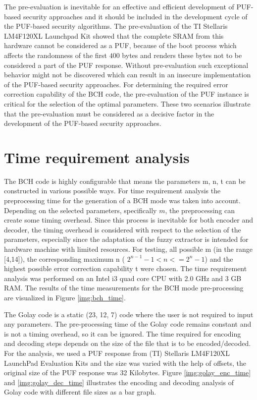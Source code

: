The pre-evaluation is inevitable for an effective and efficient development of PUF-based security approaches and it should be included in the development cycle of the PUF-based security algorithms. The pre-evaluation of the TI Stellaris LM4F120XL Launchpad Kit showed that the complete SRAM from this hardware cannot be considered as a PUF, because of the boot process which affects the randomness of the first  $400$ bytes and renders these bytes not to be considered a part of the PUF response.
Without pre-evaluation such exceptional behavior might not be discovered which can result in an insecure implementation of the PUF-based security approaches. For determining the required error correction capability of the BCH code, the pre-evaluation of the PUF instance is critical for the selection of the optimal parameters. These two scenarios illustrate that the pre-evaluation must be considered as a decisive factor in the development of the PUF-based security approaches.


\section{Time requirement analysis}

The BCH code is highly configurable that means the parameters m, n, t can be constructed in various possible ways. For time requirement analysis the preprocessing time for the generation of a BCH mode was taken into account. Depending on the selected parameters, specifically $m$, the preprocessing can create some timing overhead. Since this process is inevitable for both encoder and decoder, the timing overhead is considered with respect to the selection of the parameters, especially since
the adaptation of the fuzzy extractor is intended for hardware machine with limited resources. For testing, all possible m (in the range [4,14]), the corresponding maximum n ( $2^{n-1} - 1 < n <= 2^{n} - 1$) and the highest possible error correction capability t were chosen. The time requirement analysis was performed on an Intel i3 quad core CPU with 2.0 GHz and 3 GB RAM. The results of the time measurements for the BCH mode pre-processing are visualized in Figure \ref{img:bch_time}.

The Golay code is a static (23, 12, 7) code where the user is not required to input any parameters. The pre-processing time of the Golay code remains constant and is not a timing overhead, so it can be ignored. The time required for encoding and decoding steps depends on the size of the file that is to be encoded/decoded. For the analysis, we used a PUF response from (TI) Stellaris LM4F120XL LaunchPad Evaluation Kits and the size was varied with the help of offsets, the original size of
the PUF response was 32 Kilobytes. Figure \ref{img:golay_enc_time} and \ref{img:golay_dec_time} illustrates the encoding and decoding analysis of Golay code with different file sizes as a bar graph.\\

